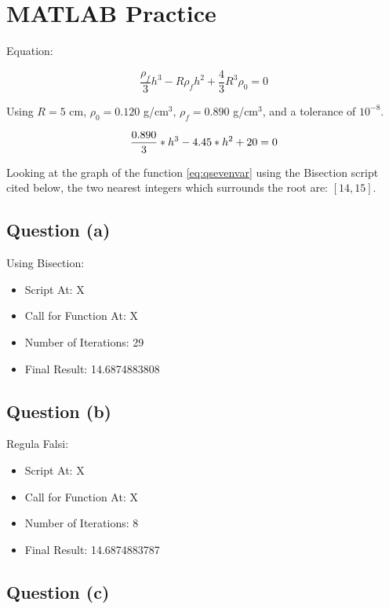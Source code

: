 \section{MATLAB Practice}
	Equation:
	
	\begin{equation}
		 \frac{\rho_{f}}{3}h^{3} - R \rho_{f}h^{2} + \frac{4}{3}R^{3} \rho_{0} = 0
	\label{eq:qseven}
	\end{equation}

	Using $R = 5$ cm, $\rho_{0} = 0.120$ g/cm$^3$, $\rho_{f} = 0.890$ g/cm$^3$, and a tolerance of $10^{-8}$.

	\begin{equation}
		 \frac{0.890}{3}*h^{3} - 4.45*h^{2} + 20 = 0 \notag \\
		\label{eq:qsevenvar}
	\end{equation}

	Looking at the graph of the function \cref{eq:qsevenvar} using the Bisection script cited below, the two nearest integers which surrounds the root are: $[14, 15]$.

	\subsection{Question (a)}

		Using Bisection:

		\begin{itemize} 
		 	\item{Script At: X}
		 	\item{Call for Function At: X}
		 	\item{Number of Iterations: 29}
		 	\item{Final Result: 14.6874883808}
		\end{itemize}

	\subsection{Question (b)}

		Regula Falsi:

		\begin{itemize} 
		 	\item{Script At: X}
		 	\item{Call for Function At: X}
		 	\item{Number of Iterations: 8}
		 	\item{Final Result: 14.6874883787}
		\end{itemize}

	\subsection{Question (c)}

